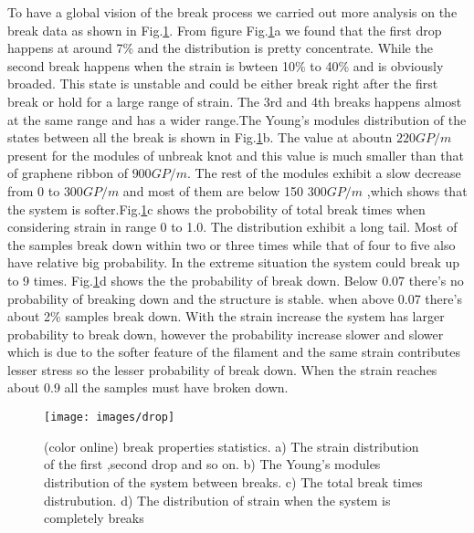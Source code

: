 \documentclass[%
 reprint,
 amsmath,amssymb,
 aps,
prb,
]{revtex4-1}
\begin{document}
To have a global vision of the break process we carried out more analysis on the break data as shown in Fig.\ref{fig:drop}. From figure Fig.\ref{fig:drop}a we found that the first drop happens at around 7\%  and the distribution is pretty concentrate. While the second break happens when the strain is bwteen 10\% to 40\% and is obviously broaded. This state is unstable and could be either break right after the first break or hold for a large range of strain. The 3rd and 4th breaks happens almost at the same range and has a wider range.The Young's modules distribution of the states between all the break is shown in Fig.\ref{fig:drop}b. The value at aboutn $220GP/m$ present for the modules of unbreak knot and this value is much smaller than that of graphene ribbon of $900GP/m$. The rest of the modules exhibit a slow decrease from 0 to $300GP/m$ and most of them are below 150 $300GP/m$ ,which shows that the system is softer.Fig.\ref{fig:drop}c shows the probobility of total break times when considering strain in range 0 to 1.0. The distribution exhibit a long tail.  Most of the samples break down within two or three times while that of four to five also have relative big probability. In the extreme situation the system could break up to 9 times. Fig.\ref{fig:drop}d shows the the probability of break down. Below 0.07 there's no probability of breaking down and the structure is stable. when above 0.07 there's about 2\% samples break down. With the strain increase the system has larger probability to break down, however the probability increase slower and slower which is due to the softer feature of the filament and the same strain contributes lesser
stress so the lesser probability of break down. When the strain reaches about 0.9 all the samples must have broken down.

\begin{figure}[b]
  \texttt{[image: images/drop]}
  \caption{\label{fig:drop}  (color online) break properties statistics. a) The strain distribution of the first ,second drop and so on. b) The Young's modules distribution of the system between breaks. c) The total break times distrubution. d) The distribution of strain when the system is completely breaks}
\end{figure}
\end{document}
